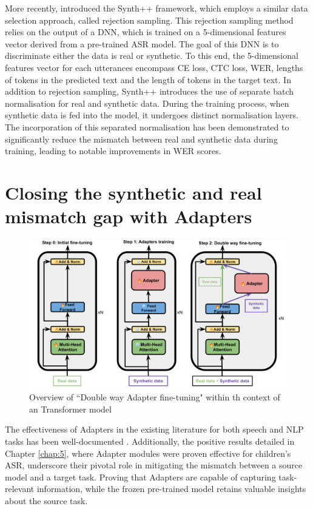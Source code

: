 More recently, \cite{hu2022synt++} introduced the Synth++ framework, which employs a similar data selection approach, called rejection sampling. This rejection sampling method relies on the output of a \ac{DNN}, which is trained on a 5-dimensional features vector derived from a pre-trained \ac{ASR} model. The goal of this \ac{DNN} is to discriminate either the data is real or synthetic. To this end, the 5-dimensional features vector for each utterances encompass \ac{CE} loss, \ac{CTC} loss, \ac{WER}, lengths of tokens in the predicted text and the length of tokens in the target text. In addition to rejection sampling, Synth++ introduces the use of separate batch normalisation for real and synthetic data. During the training process, when synthetic data is fed into the model, it undergoes distinct normalisation layers. The incorporation of this separated normalisation has been demonstrated to significantly reduce the mismatch between real and synthetic data during training, leading to notable improvements in \ac{WER} scores.

\section{Closing the synthetic and real mismatch gap with Adapters}

\begin{figure}
    \centering
    \includegraphics[width=\textwidth]{imgs/TTS_Transformer.png}
    \caption{Overview of ``Double way Adapter fine-tuning"  within th context of an Transformer model}
    \label{fig:overall}
\end{figure}

The effectiveness of Adapters in the existing literature for both speech and \ac{NLP} tasks has been well-documented \cite{pfeiffer, philip2020monolingual, mao-etal-2022-unipelt}. Additionally, the positive results detailed in Chapter \ref{chap:5}, where Adapter modules were proven effective for children's \ac{ASR}, underscore their pivotal role in mitigating the mismatch between a source model and a target task. Proving that Adapters are capable of capturing task-relevant information, while the frozen pre-trained model retains valuable insights about the source task.

